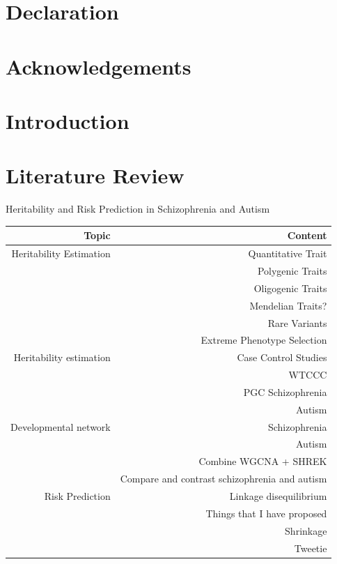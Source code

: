 \documentclass{book}
\begin{document}
	\chapter*{Declaration}
	
	\cleardoublepage
	\chapter*{Acknowledgements}
	\cleardoublepage
	\renewcommand{\nomname}{Abbreviations}
	\printnomenclature
	
	\cleardoublepage
	\begin{singlespace}
		\tableofcontents
	\end{singlespace}
\mainmatter
\chapter*{Introduction}\pagestyle{fancy}
\chapter{Literature Review}
Heritability and Risk Prediction in Schizophrenia and Autism
\begin{table}[h]
	\begin{tabular}{|r|r|}
		\hline
		\textbf{Topic} & \textbf{Content} \\
		\hline
		Heritability Estimation & Quantitative Trait \\
		& Polygenic Traits\\
		& Oligogenic Traits\\
		& Mendelian Traits?\\
		& Rare Variants \\
		& Extreme Phenotype Selection \\
		\hline
		Heritability estimation & Case Control Studies \\
		& WTCCC \\
		& PGC Schizophrenia \\
		& Autism \\
		\hline
		Developmental network & Schizophrenia \\
		& Autism \\
		& Combine WGCNA + SHREK \\
		& Compare and contrast schizophrenia and autism\\
		\hline
		Risk Prediction & Linkage disequilibrium \\
		& Things that I have proposed \\
		& Shrinkage \\
		& Tweetie \\
		\hline
	\end{tabular}
\end{table}
\end{document}
